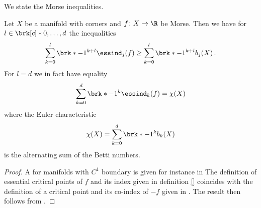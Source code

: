 We state the Morse inequalities.
\begin{theorem}
Let $X$ be a manifold with corners and $f\colon X\to\R$ be Morse.
Then we have for $l\in\brk[c]*{0,\dots,d}$ the inequalities
\begin{align*}
  \sum_{k=0}^l \brk*{-1}^{k+l}\essind_j(f)\geq \sum_{k=0}^l\brk*{-1}^{k+l}b_j(X)\,.
\end{align*}
For $l=d$ we in fact have equality
\begin{align*}
  \sum_{k=0}^d \brk*{-1}^{k}\essind_k(f)= \chi(X)
\end{align*}
where the Euler characteristic
\begin{align*}
  \chi(X)=\sum_{k=0}^d\brk*{-1}^{k}b_k(X)
\end{align*}
is the alternating sum of the Betti numbers.
\end{theorem}
\begin{proof}
  A for manifolds with $C^1$ boundary is given for instance in \cite[Theorem 10.2']{Morse1969}
  The definition of essential critical points of $f$ and its index given in definition \ref{} coincides with 
  the definition of a critical point and its co-index of $-f$ given in \cite{Agrach1991}.
  The result then follows from \cite[Theorem 2.4]{Agrach1991}.
\end{proof}

